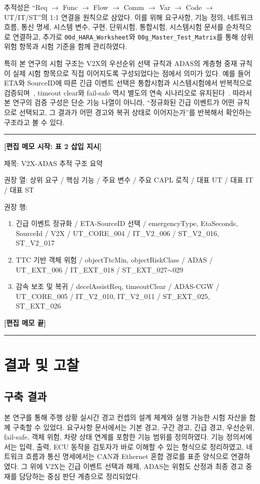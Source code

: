 \documentclass[11pt,a4paper]{article}
\newenvironment{editmemo}[1]
{
\par\noindent\rule{\linewidth}{0.4pt}\par
\noindent\textbf{[편집 메모 시작: #1]}\par
\small\itshape
}
{
\par\normalsize\normalfont
\noindent\textbf{[편집 메모 끝]}\par
\noindent\rule{\linewidth}{0.4pt}\par
}
\begin{document}
추적성은 ``Req $\rightarrow$ Func $\rightarrow$ Flow $\rightarrow$ Comm $\rightarrow$ Var $\rightarrow$ Code $\rightarrow$ UT/IT/ST''의 1:1 연결을 원칙으로 삼았다. 이를 위해 요구사항, 기능 정의, 네트워크 흐름, 통신 명세, 시스템 변수, 구현, 단위시험, 통합시험, 시스템시험 문서를 순차적으로 연결하고, 추가로 \texttt{00d\_HARA\_Worksheet}와 \texttt{00g\_Master\_Test\_Matrix}를 통해 상위 위험 항목과 시험 기준을 함께 관리하였다.

특히 본 연구의 시험 구조는 V2X의 우선순위 선택 규칙과 ADAS의 계층형 중재 규칙이 실제 시험 항목으로 직접 이어지도록 구성되었다는 점에서 의미가 있다. 예를 들어 ETA와 SourceID에 따른 긴급 이벤트 선택은 통합시험과 시스템시험에서 반복적으로 검증되며~\cite{integration_test,system_test}, timeout clear와 fail-safe 역시 별도의 연속 시나리오로 유지된다~\cite{integration_test,master_test_matrix,system_test}. 따라서 본 연구의 검증 구성은 단순 기능 나열이 아니라, ``정규화된 긴급 이벤트가 어떤 규칙으로 선택되고, 그 결과가 어떤 경고와 복귀 상태로 이어지는가''를 반복해서 확인하는 구조라고 볼 수 있다.

\begin{editmemo}{표 2 삽입 지시}
제목: V2X-ADAS 추적 구조 요약

권장 열: 상위 요구 / 핵심 기능 / 주요 변수 / 주요 CAPL 로직 / 대표 UT / 대표 IT / 대표 ST

권장 행:
\begin{enumerate}[label=\arabic*.]
\item 긴급 이벤트 정규화 / ETA-SourceID 선택 / emergencyType, EtaSeconds, SourceId / V2X / UT\_CORE\_004 / IT\_V2\_006 / ST\_V2\_016, ST\_V2\_017
\item TTC 기반 객체 위험 / objectTtcMin, objectRiskClass / ADAS / UT\_EXT\_006 / IT\_EXT\_018 / ST\_EXT\_027$\sim$029
\item 감속 보조 및 복귀 / decelAssistReq, timeoutClear / ADAS-CGW / UT\_CORE\_005 / IT\_V2\_010, IT\_V2\_011 / ST\_EXT\_025, ST\_EXT\_026
\end{enumerate}
\end{editmemo}

\section{결과 및 고찰}

\subsection{구축 결과}

본 연구를 통해 주행 상황 실시간 경고 컨셉의 설계 체계와 실행 가능한 시험 자산을 함께 구축할 수 있었다. 요구사항 문서에서는 기본 경고, 구간 경고, 긴급 경고, 우선순위, fail-safe, 객체 위험, 차량 상태 연계를 포함한 기능 범위를 정의하였다. 기능 정의서에서는 입력, 출력, ECU 동작을 검토자가 바로 이해할 수 있는 형식으로 정리하였고, 네트워크 흐름과 통신 명세에서는 CAN과 Ethernet 혼합 경로를 표준 양식으로 연결하였다. 그 위에 V2X는 긴급 이벤트 선택과 해제, ADAS는 위험도 산정과 최종 경고 중재를 담당하는 중심 판단 계층으로 정리되었다.
\end{document}
